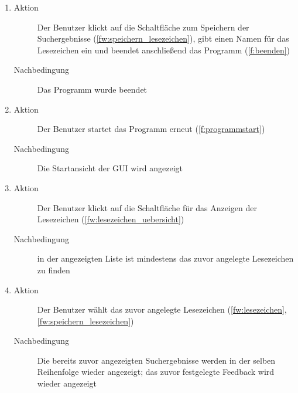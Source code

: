 \begin{enumerate} [label=\bfseries /TSW \arabic*0/, leftmargin=*]
\begin{enumerate}[leftmargin=0pt]
\begin{description}
		\end{description}
		\item
		\begin{description}
			\item[Aktion] Der Benutzer klickt auf die Schaltfläche zum Speichern der Suchergebnisse (\ref{fw:speichern_lesezeichen}), gibt einen Namen für das Lesezeichen ein und beendet anschließend das Programm (\ref{f:beenden})
			\item[Nachbedingung] Das Programm wurde beendet
		\end{description}
		\item
		\begin{description}
			\item[Aktion] Der Benutzer startet das Programm erneut (\ref{f:programmstart})
			\item[Nachbedingung] Die Startansicht der GUI wird angezeigt
		\end{description}
		\item
		\begin{description}
			\item[Aktion] Der Benutzer klickt auf die Schaltfläche für das Anzeigen der Lesezeichen (\ref{fw:lesezeichen_uebersicht})
			\item[Nachbedingung] in der angezeigten Liste ist mindestens das zuvor angelegte Lesezeichen zu finden
		\end{description}
		\item
		\begin{description}
			\item[Aktion] Der Benutzer wählt das zuvor angelegte Lesezeichen (\ref{fw:lesezeichen}, \ref{fw:speichern_lesezeichen})
			\item[Nachbedingung] Die bereits zuvor angezeigten Suchergebnisse werden in der selben Reihenfolge wieder angezeigt; das zuvor festgelegte Feedback wird wieder angezeigt
		\end{description}
	\end{enumerate}


\end{enumerate}
